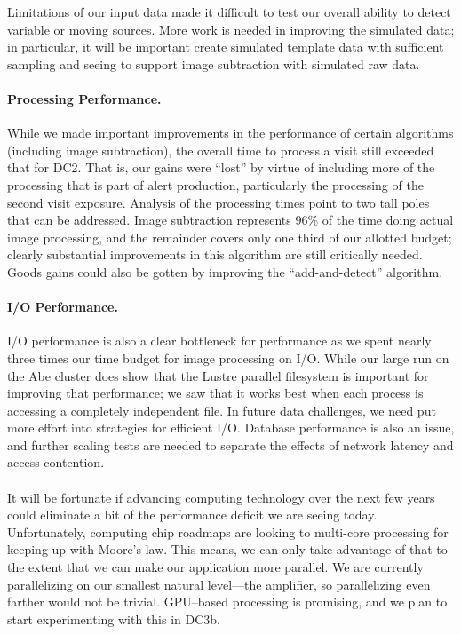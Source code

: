 Limitations of our input data made it difficult to test our overall
ability to detect variable or moving sources.  More work is needed in
improving the simulated data; in particular, it will be important
create simulated template data with sufficient sampling and seeing to
support image subtraction with simulated raw data.  

\paragraph{Processing Performance.}  While we made important
improvements in the performance of certain algorithms (including image
subtraction), the overall time to process a visit still exceeded that
for DC2.  That is, our gains were ``lost'' by virtue of
including more of the processing that is part of alert production,
particularly the processing of the second visit exposure.  Analysis of
the processing times point to two tall poles that can be addressed.
Image subtraction represents 96\% of the time doing actual image
processing, and the remainder covers only one third of our allotted
budget; clearly substantial improvements in this algorithm are still
critically needed.  Goods gains could also be gotten by improving the
``add-and-detect'' algorithm.  

\paragraph{I/O Performance.}  I/O performance is also a clear
bottleneck for performance as we spent nearly three times our time
budget for image processing on I/O.  While our large run on the Abe
cluster does show that the Lustre parallel filesystem is important
for improving that performance; we saw that it works best when each
process is accessing a completely independent file.  In future data
challenges, we need put more effort into strategies for efficient I/O.
Database performance is also an issue, and further scaling tests are
needed to separate the effects of network latency and access
contention.  

\paragraph{} It will be fortunate if advancing computing technology
over the next 
few years could eliminate a bit of the performance deficit we are seeing
today.  Unfortunately, computing chip roadmaps are looking to
multi-core processing for keeping up with Moore's law.  This means, we
can only take advantage of that to the extent that we can make our
application more parallel.  We are currently parallelizing on our
smallest natural level---the amplifier, so parallelizing even farther
would not be trivial.  GPU--based processing is promising, and we plan
to start experimenting with this in DC3b. 





